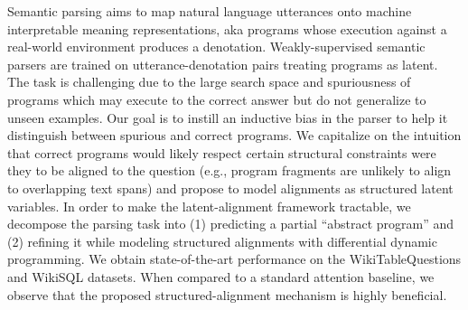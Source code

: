 Semantic parsing aims to map natural language utterances onto machine interpretable meaning representations, aka programs whose execution against a real-world environment produces a denotation. Weakly-supervised semantic parsers are trained on utterance-denotation pairs treating programs as latent. The task is challenging due to the large search space and spuriousness of programs which may execute to the correct answer but do not generalize to unseen examples.  Our goal is to instill an inductive bias in the parser to help it distinguish between spurious and correct programs.  We capitalize on the intuition that correct programs would likely respect certain structural constraints were they to be aligned to the question (e.g., program fragments are unlikely to align to overlapping text spans) and propose to model alignments as structured latent variables.  In order to make the latent-alignment framework tractable, we decompose the parsing task into (1) predicting a partial ``abstract program'' and (2) refining it while modeling structured alignments with differential dynamic programming. We obtain state-of-the-art performance on the WikiTableQuestions and WikiSQL datasets. When compared to a standard attention baseline, we observe that the proposed structured-alignment mechanism is highly beneficial.